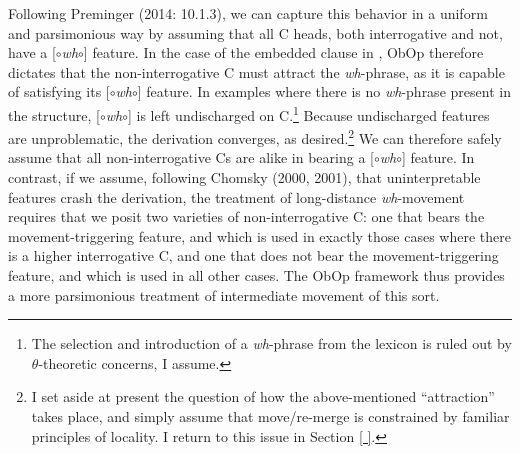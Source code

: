 \documentclass[11pt, letterpaper]{paper_nick}
\newcommand{\fm}[1]{[$\circ$#1$\circ$]}
\begin{document}
Following Preminger (2014: 10.1.3), we can capture this behavior in a uniform and parsimonious way by assuming that all C heads, both interrogative and not, have a \fm{\emph{wh}} feature. In the case of the embedded clause in \Last, ObOp therefore dictates that the non-interrogative C {must} attract the \emph{wh}-phrase, as it is capable of satisfying its \fm{\emph{wh}} feature. In examples where there is no \emph{wh}-phrase present in the structure, \fm{\emph{wh}} is left undischarged on C.\footnote{The selection and introduction of a \emph{wh}-phrase from the lexicon is ruled out by $\theta$-theoretic concerns, I assume.} Because undischarged features are unproblematic, the derivation converges, as desired.\footnote{\label{locality}I set aside at present the question of how the above-mentioned ``attraction'' takes place, and simply assume that move/re-merge is constrained by familiar principles of locality. I return to this issue in Section \ref{ }.}  
We can therefore safely assume that all non-interrogative Cs are alike in bearing a \fm{\emph{wh}} feature. In contrast, if we assume, following Chomsky (2000, 2001), that uninterpretable features crash the derivation, the treatment of long-distance \emph{wh}-movement requires that we posit two varieties of non-interrogative C: one that bears the movement-triggering feature, and which is used in exactly those cases where there is a higher interrogative C, and one that does not bear the movement-triggering feature, and which is used in all other cases. The ObOp framework thus provides a more parsimonious treatment of intermediate movement of this sort. 
\end{document}
